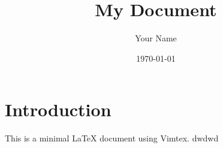 \documentclass{article}
\title{My Document}
\author{Your Name}
\date{\today}
\begin{document}
\maketitle

\section{Introduction}
This is a minimal LaTeX document using Vimtex.
dwdwd
\end{document}
